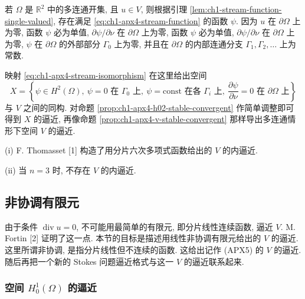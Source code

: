 \begin{Remark}
\label{rem:ch1-apx4-multiply-connected}
若 $\Omega$ 是 $\mathbb R^2$ 中的多连通开集, 且 $u\in V$, 则根据引理 \ref{lem:ch1-stream-function-single-valued}, 存在满足 \eqref{eq:ch1-apx4-stream-function} 的函数 $\psi$. 因为 $u$ 在 $\partial\Omega$ 上为零, 函数 $\psi$ 必为单值, $\partial\psi/\partial\nu$ 在 $\partial\Omega$ 上为零, 函数 $\psi$ 必为单值, $\partial\psi/\partial\nu$ 在 $\partial\Omega$ 上为零, $\psi$ 在 $\partial\Omega$ 的外部部分 $\Gamma_0$ 上为零, 并且在 $\partial\Omega$ 的内部连通分支 $\Gamma_1,\Gamma_2,\ldots$ 上为常数.

映射 \eqref{eq:ch1-apx4-stream-isomorphism} 在这里给出空间
\begin{equation}
X=\left\{\psi\in H^2(\Omega),\ \psi=0\text{ 在 }\Gamma_0\text{ 上},\ 
\psi=\mathrm{const}\text{ 在各 }\Gamma_i\text{ 上},\ 
\frac{\partial\psi}{\partial\nu}=0\text{ 在 }\partial\Omega\text{ 上}\right\}
\label{eq:ch1-apx4-multiply-connected-space}
\end{equation}
与 $V$ 之间的同构. 对命题 \ref{prop:ch1-apx4-h02-stable-convergent} 作简单调整即可得到 $X$ 的逼近, 再像命题 \ref{prop:ch1-apx4-v-stable-convergent} 那样导出多连通情形下空间 $V$ 的逼近.
\end{Remark}

\begin{Remark}
\label{rem:ch1-apx4-higher-degree}
(i) F. Thomasset [1] 构造了用分片六次多项式函数给出的 $V$ 的内逼近.

(ii) 当 $n=3$ 时, 不存在 $V$ 的内逼近.
\end{Remark}

\subsection{非协调有限元}
\label{subsec:ch1-nonconforming-elements}

由于条件 $\operatorname{div}u=0$, 不可能用最简单的有限元, 即分片线性连续函数, 逼近 $V$. M. Fortin [2] 证明了这一点. 本节的目标是描述用线性非协调有限元给出的 $V$ 的逼近. 这里所谓非协调, 是指分片线性但不连续的函数. 这给出记作 (APX5) 的 $V$ 的逼近. 随后再把一个新的 Stokes 问题逼近格式与这一 $V$ 的逼近联系起来.

\subsubsection{空间 \texorpdfstring{$H_0^1(\Omega)$}{H01(Omega)} 的逼近}
\label{subsubsec:ch1-nonconforming-h01}

